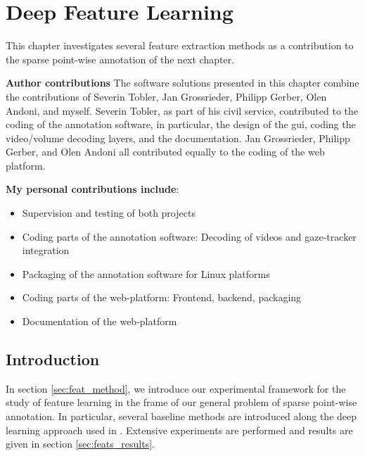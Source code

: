 \chapter{Deep Feature Learning}
This chapter investigates several feature extraction methods as a contribution to the sparse point-wise annotation of the next chapter.

\textbf{Author contributions} The software solutions presented in this chapter combine the contributions of Severin Tobler, Jan Grossrieder, Philipp Gerber, Olen Andoni, and myself.
Severin Tobler, as part of his civil service, contributed to the coding of the annotation software, in particular, the design of the \gls{gui}, coding the video/volume decoding layers, and the documentation.
Jan Grossrieder, Philipp Gerber, and Olen Andoni all contributed equally to the coding of the web platform.

\textbf{My personal contributions include}:
\begin{itemize}
    \item Supervision and testing of both projects
    \item Coding parts of the annotation software: Decoding of videos and gaze-tracker integration
    \item Packaging of the annotation software for Linux platforms
    \item Coding parts of the web-platform: Frontend, backend, packaging
    \item Documentation of the web-platform
\end{itemize}

\section{Introduction}

In section \ref{sec:feat_method}, we introduce our experimental framework for the study of feature learning in the frame of our general problem of sparse point-wise annotation.
In particular, several baseline methods are introduced along the deep learning approach used in \cite{lejeune18}.
Extensive experiments are performed and results are given in section \ref{sec:feats_results}.


\endinput

